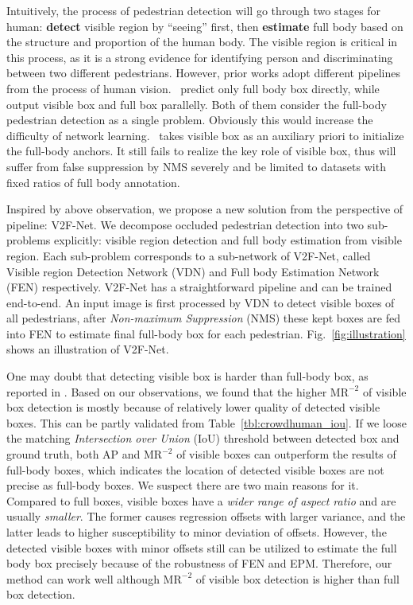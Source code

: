 \documentclass[10pt,twocolumn,letterpaper]{article}
\begin{document}
Intuitively, the process of pedestrian detection will go through two stages for human: \textbf{detect} visible region by ``seeing'' first, then \textbf{estimate} full body based on the structure and proportion of the human body. The visible region is critical in this process, as it is a strong evidence for identifying person and discriminating between two different pedestrians. However, prior works adopt different pipelines from the process of human vision.~\cite{wang2018repulsion, chu2020crowddet} predict only full body box directly, while~\cite{Zhou_2018_bibox, huang2020R2nms} output visible box and full box parallelly. Both of them consider the full-body pedestrian detection as a single problem. Obviously this would increase the difficulty of network learning.~\cite{prnet} takes visible box as an auxiliary priori to initialize the full-body anchors. It still fails to realize the
key role of visible box, thus will suffer from false suppression by NMS severely and be limited to datasets with fixed ratios of full body annotation.














Inspired by above observation, we propose a new solution from the perspective of pipeline: V2F-Net. We decompose occluded pedestrian detection into two sub-problems explicitly: visible region detection and full body estimation from visible region. Each sub-problem corresponds to a sub-network of V2F-Net, called Visible region Detection Network (VDN) and Full body Estimation Network (FEN) respectively. V2F-Net has a straightforward pipeline and can be trained end-to-end. An input image is first processed by VDN to detect visible boxes of all pedestrians, after \textit{Non-maximum Suppression} (NMS) these kept boxes are fed into FEN to estimate final full-body box for each pedestrian. Fig.~\ref{fig:illustration} shows an illustration of V2F-Net.


One may doubt that detecting visible box is harder than full-body box, as reported in \cite{shao2018crowdhuman}. Based on our observations, we found that the higher $\text{MR}^{-2}$ of visible box detection is mostly because of relatively lower quality of detected visible boxes. This can be partly validated from Table~\ref{tbl:crowdhuman_iou}. If we loose the matching \textit{Intersection over Union} (IoU) threshold between detected box and ground truth, both AP and $\text{MR}^{-2}$ of visible boxes can outperform the results of full-body boxes, which indicates the location of detected visible boxes are not precise as full-body boxes. We suspect there are two main reasons for it. Compared to full boxes, visible boxes have a \textit{wider range of aspect ratio} and are usually \textit{smaller}. The former causes regression offsets with larger variance, and the latter 
leads to higher susceptibility to minor deviation of offsets. However, the detected visible boxes with minor offsets still can be utilized to estimate the full body box precisely because of the robustness of FEN and EPM. Therefore, our method can work well although $\text{MR}^{-2}$ of visible box detection is higher than full box detection.
\end{document}

